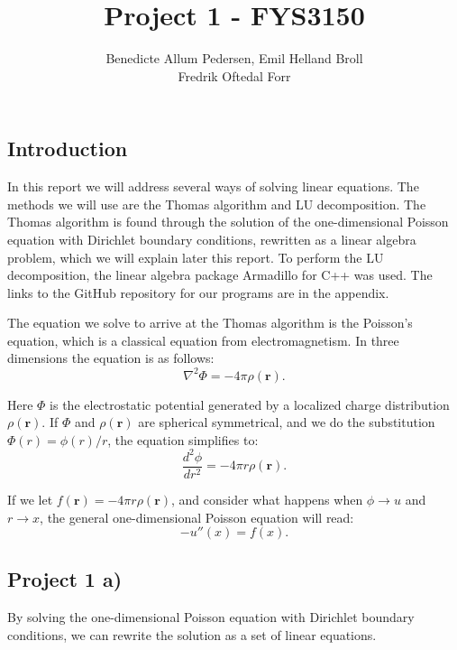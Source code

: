 \documentclass{article}
\title{Project 1 - FYS3150}\vspace{-3ex}
\author{Benedicte Allum Pedersen, Emil Helland Broll\\ Fredrik Oftedal Forr}
\date{\vspace{-5ex}}
\begin{document}
\maketitle

\subsection*{Introduction}
In this report we will address several ways of solving linear equations. The methods we will use are the Thomas algorithm and LU decomposition. The Thomas algorithm is found through the solution of the one-dimensional Poisson equation with Dirichlet boundary conditions, rewritten as a linear algebra problem, which we will explain later this report. To perform the LU decomposition, the linear algebra package Armadillo for C++ was used. The links to the GitHub repository for our programs are in the appendix.

\vspace{0.3cm}

The equation we solve to arrive at the Thomas algorithm is the Poisson's equation, which is a classical equation from electromagnetism. In three dimensions the equation is as follows:
\begin{equation*}
\nabla^2 \Phi = -4\pi \rho (\mathbf{r}).
\end{equation*}

Here $\Phi$ is the electrostatic potential generated by a localized charge distribution $\rho (\mathbf{r})$. If $\Phi$ and $\rho (\mathbf{r})$ are spherical symmetrical, and we do the substitution $\Phi(r)= \phi(r)/r$, the equation simplifies to:
\begin{equation*}
\frac{d^2\phi}{dr^2}= -4\pi r\rho(\mathbf{r}).
\end{equation*}

If we let $f(\mathbf{r}) = -4\pi r \rho (\mathbf{r})$, and consider what happens when $\phi\rightarrow u$ and
$r\rightarrow x$, the general one-dimensional Poisson equation will read:
\begin{equation*}
-u''(x) = f(x).
\end{equation*}

\subsection*{Project 1 a)}

\noindent By solving the one-dimensional Poisson equation with Dirichlet boundary conditions, we can rewrite the solution as a set of linear equations.\\
\end{document}

